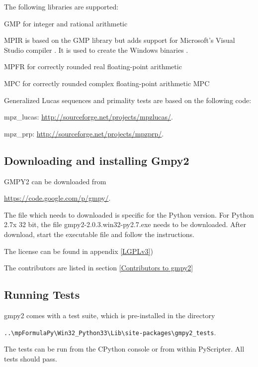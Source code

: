 The following libraries are supported:

\vpara
GMP for integer and rational arithmetic \citep{Granlund12}


\vpara
MPIR is based on the GMP library but adds support for Microsoft's Visual Studio
compiler . It is used to create the Windows binaries  \citep{mpir}.


\vpara
MPFR for correctly rounded real floating-point arithmetic \citep{MPFR_2007}


\vpara
MPC for correctly rounded complex floating-point arithmetic MPC \citep{mpc_2012}


\vpara
Generalized Lucas sequences and primality tests are based on the following code:

\vpara
mpz\_lucas: \href{http://sourceforge.net/projects/mpzlucas/}{http://sourceforge.net/projects/mpzlucas/}. 

mpz\_prp: \href{http://sourceforge.net/projects/mpzprp/}{http://sourceforge.net/projects/mpzprp/}. 





\subsection{Downloading and installing Gmpy2}

GMPY2 can be downloaded from

\vpara
\href{https://code.google.com/p/gmpy/}{https://code.google.com/p/gmpy/}.

The file which needs to downloaded is specific for the Python version. For Python 2.7x 32 bit, the file gmpy2-2.0.3.win32-py2.7.exe needs to be downloaded. After download, start the executable file and follow the instructions.

\vpara
The license can be found in appendix \ref{LGPLv3})

The contributors are listed in section \ref{Contributors to gmpy2}



\subsection{Running Tests}

gmpy2 comes with a test suite, which is pre-installed in the directory

\vpara
\verb|..\mpFormulaPy\Win32_Python33\Lib\site-packages\gmpy2_tests|.

\vpara
The tests can be run from the CPython console or from within PyScripter. All tests should pass.


